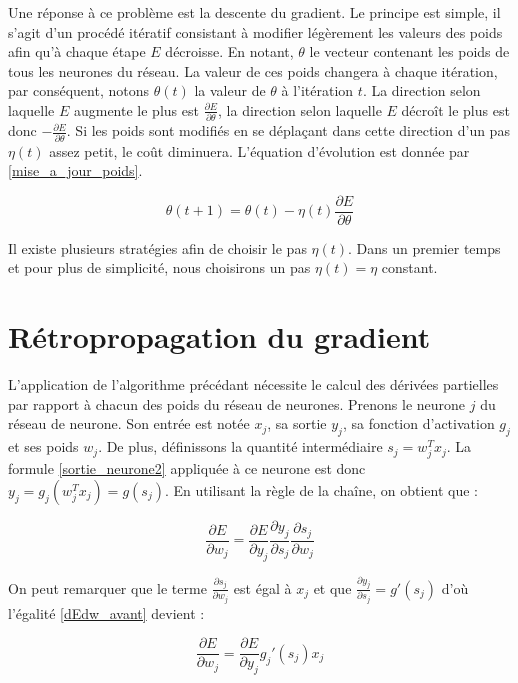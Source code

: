 \documentclass{report}
\begin{document}
Une réponse à ce problème est la descente du gradient. Le principe est simple, il s'agit d'un procédé itératif consistant à modifier légèrement les valeurs des poids afin qu'à chaque étape $E$ décroisse.  En notant, $\theta$ le vecteur contenant les poids de tous les neurones du réseau. La valeur de ces poids changera à chaque itération, par conséquent, notons $\theta(t)$ la valeur de $\theta$ à l'itération $t$. La direction selon laquelle $E$ augmente le plus est $\frac{\partial E}{\partial \theta}$, la direction selon laquelle $E$ décroît le plus est donc $-\frac{\partial E}{\partial \theta}$. Si les poids sont modifiés en se déplaçant dans cette direction d'un pas $\eta(t)$ assez petit, le coût diminuera. L'équation d'évolution est donnée par \ref{mise_a_jour_poids}.

\begin{equation}
\theta(t+1) = \theta(t) - \eta(t) \frac{\partial E}{\partial \theta}
\label{mise_a_jour_poids}
\end{equation}

Il existe plusieurs stratégies afin de choisir le pas $\eta(t)$. Dans un premier temps et pour plus de simplicité, nous choisirons un pas $\eta(t)=\eta$ constant.

\section{Rétropropagation du gradient}

L'application de l'algorithme précédant nécessite le calcul des dérivées partielles par rapport à chacun des poids du réseau de neurones. Prenons le neurone $j$ du réseau de neurone. Son entrée est notée $x_j$, sa sortie $y_j$, sa fonction d'activation $g_j$ et ses poids $w_j$. De plus, définissons la quantité intermédiaire $s_j = w_j^Tx_j$. La formule \ref{sortie_neurone2} appliquée à ce neurone est donc $y_j = g_j(w_j^Tx_j) = g(s_j)$. En utilisant la règle de la chaîne, on obtient que :

\begin{equation}
\frac{\partial E}{\partial w_j} = \frac{\partial E}{\partial y_j}\frac{\partial y_j}{\partial s_j}\frac{\partial s_j}{\partial w_j}
\label{dEdw_avant}
\end{equation}

On peut remarquer que le terme $\frac{\partial s_j}{\partial w_j}$ est égal à $x_j$ et que $\frac{\partial y_j}{\partial s_j} = g'(s_j)$ d'où l'égalité \ref{dEdw_avant} devient :

\begin{equation}
\frac{\partial E}{\partial w_j} = \frac{\partial E}{\partial y_j} g_j'(s_j) x_j
\label{dEdw}
\end{equation}
\end{document}
